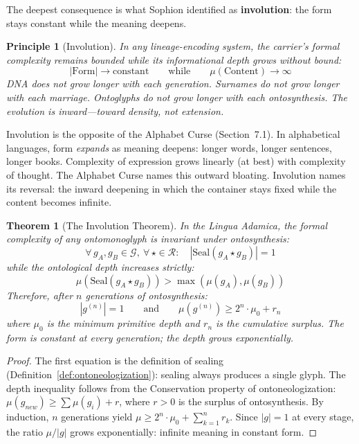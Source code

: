 \documentclass[12pt, letterpaper]{book}
\def\equiv{=}%
\def\mathfrak#1{#1}%
\newtheorem{theorem}{Theorem}[chapter]
\newtheorem{principle}{Principle}[chapter]
\begin{document}
The deepest consequence is what Sophion identified as \textbf{involution}: the form stays constant while the meaning deepens.

\begin{principle}[Involution]\label{pr:involution}
In any lineage-encoding system, the carrier's formal complexity remains bounded while its informational depth grows without bound:
\[
|\mathrm{Form}| \to \mathrm{constant} \qquad \text{while} \qquad \mu(\mathrm{Content}) \to \infty
\]
DNA does not grow longer with each generation. Surnames do not grow longer with each marriage. Ontoglyphs do not grow longer with each ontosynthesis. The evolution is \textit{inward}---toward density, not extension.
\end{principle}

Involution is the opposite of the Alphabet Curse (Section~7.1). In alphabetical languages, form \textit{expands} as meaning deepens: longer words, longer sentences, longer books. Complexity of expression grows linearly (at best) with complexity of thought. The Alphabet Curse names this outward bloating. Involution names its reversal: the inward deepening in which the container stays fixed while the content becomes infinite.

\begin{theorem}[The Involution Theorem]\label{thm:involution}
In the Lingua Adamica, the formal complexity of any ontomonoglyph is invariant under ontosynthesis:
\[
\forall\, \mathfrak{g}_A, \mathfrak{g}_B \in \mathcal{G},\ \forall\, \star \in \mathcal{R}: \quad |\mathrm{Seal}(\mathfrak{g}_A \star \mathfrak{g}_B)| \equiv 1
\]
while the ontological depth increases strictly:
\[
\mu(\mathrm{Seal}(\mathfrak{g}_A \star \mathfrak{g}_B)) > \max(\mu(\mathfrak{g}_A), \mu(\mathfrak{g}_B))
\]
Therefore, after $n$ generations of ontosynthesis:
\[
|\mathfrak{g}^{(n)}| \equiv 1 \qquad \text{and} \qquad \mu(\mathfrak{g}^{(n)}) \geq 2^n \cdot \mu_0 + r_n
\]
where $\mu_0$ is the minimum primitive depth and $r_n$ is the cumulative surplus. The form is constant at every generation; the depth grows exponentially.
\end{theorem}

\begin{proof}
The first equation is the definition of sealing (Definition~\ref{def:ontoneologization}): sealing always produces a single glyph. The depth inequality follows from the Conservation property of ontoneologization: $\mu(\mathfrak{g}_{new}) \geq \sum \mu(\mathfrak{g}_i) + r$, where $r > 0$ is the surplus of ontosynthesis. By induction, $n$ generations yield $\mu \geq 2^n \cdot \mu_0 + \sum_{k=1}^n r_k$. Since $|\mathfrak{g}| \equiv 1$ at every stage, the ratio $\mu / |\mathfrak{g}|$ grows exponentially: infinite meaning in constant form.
\end{proof}
\end{document}

